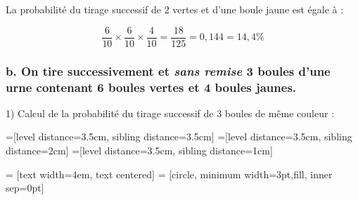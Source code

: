 \documentclass[10pt]{article}
\begin{document}
\hspace{13pt}La probabilité du tirage successif de 2 vertes et d'une boule jaune est égale à :

$$\frac{6}{10}\times \frac{6}{10}\times \frac{4}{10}=\frac{18}{125}=0,144=14,4\%$$\vspace{0,1cm}

\subsubsection*{b. On tire successivement et \textit{sans remise} 3 boules d'une urne contenant 6 boules vertes et 4 boules jaunes.}

\hspace{16pt}1) Calcul de la probabilité du tirage successif de 3 boules de même couleur :\vspace{1cm}

=[level distance=3.5cm, sibling distance=3.5cm]
=[level distance=3.5cm, sibling distance=2cm]
=[level distance=3.5cm, sibling distance=1cm]

 = [text width=4em, text centered]
 = [circle, minimum width=3pt,fill, inner sep=0pt]
\end{document}
